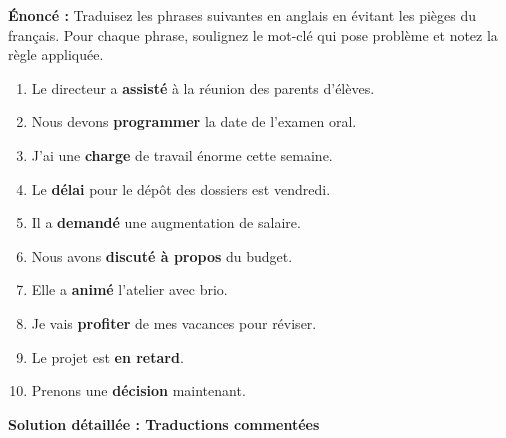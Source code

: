 \documentclass[11pt]{article}
\begin{document}
\begin{exoresolu}
\textbf{Énoncé :} Traduisez les phrases suivantes en anglais en évitant les pièges du français. Pour chaque phrase, soulignez le mot-clé qui pose problème et notez la règle appliquée.

\begin{enumerate}
    \item Le directeur a \textbf{assisté} à la réunion des parents d'élèves.
    \item Nous devons \textbf{programmer} la date de l'examen oral.
    \item J'ai une \textbf{charge} de travail énorme cette semaine.
    \item Le \textbf{délai} pour le dépôt des dossiers est vendredi.
    \item Il a \textbf{demandé} une augmentation de salaire.
    \item Nous avons \textbf{discuté à propos} du budget.
    \item Elle a \textbf{animé} l'atelier avec brio.
    \item Je vais \textbf{profiter} de mes vacances pour réviser.
    \item Le projet est \textbf{en retard}.
    \item Prenons une \textbf{décision} maintenant.
\end{enumerate}

\tcblower

\textbf{Solution détaillée : Traductions commentées}


\end{exoresolu}
\end{document}
